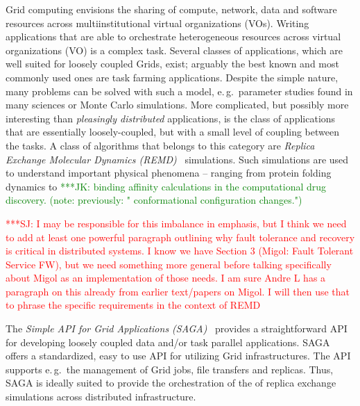 \documentclass[times, 10pt,twocolumn]{article}
\newcommand{\kimnote}[1]{ {\textcolor{green} { ***JK: #1 }}}
\newcommand{\jhanote}[1]{ {\textcolor{red} { ***SJ: #1 }}}
\begin{document}
                           
Grid computing envisions the sharing of compute, network, data and
software resources across multiinstitutional virtual organizations
(VOs). Writing applications that are able to orchestrate heterogeneous
resources across virtual organizations (VO) is a complex task.  Several 
classes of applications, which are well suited for loosely
coupled Grids, exist; arguably the best known and most commonly used ones are
task farming applications. Despite the simple nature, many problems
can be solved with such a model, e.\,g.\ parameter studies found in
many sciences or Monte Carlo simulations. More
complicated, but possibly more interesting than {\it pleasingly
  distributed} applications, is the class of applications that are
essentially loosely-coupled, but with a small level of coupling
between the tasks.   A class of algorithms that belongs to this category are
\emph{Replica Exchange Molecular Dynamics (REMD)}~\cite{hansmann,Sugita:1999rm} simulations.
Such simulations are used to understand important physical phenomena
-- ranging from protein folding dynamics to \kimnote{binding affinity
  calculations in the computational drug discovery.  (note:
  previously: " conformational configuration changes.")}

\jhanote{I may be responsible for this imbalance in emphasis, but I
  think we need to add at least one powerful paragraph outlining why
  fault tolerance and recovery is critical in distributed systems. I
  know we have Section 3 (Migol: Fault Tolerant Service FW), but we
  need something more general before talking specifically about Migol
  as an implementation of those needs. I am sure Andre L has a
  paragraph on this already from earlier text/papers on Migol. I will
  then use that to phrase the specific requirements in the context of
  REMD}

The \emph{Simple API for Grid Applications (SAGA)}~\cite{saga_gfd90}
provides a straightforward API for developing loosely coupled data and/or task
parallel applications.
SAGA offers a standardized, easy to use API for utilizing Grid
infrastructures. The API supports e.\,g.\ the management of Grid jobs,
file transfers and replicas. Thus, SAGA is ideally suited to provide
the orchestration of the of replica exchange simulations across
distributed infrastructure.
                                                         
\end{document}
